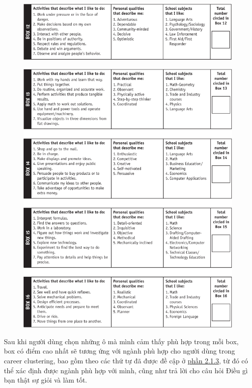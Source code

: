 \begin{figure}[H]
    \centering
    \includegraphics[width=0.9\linewidth]{images/chap3/CC4.png}
\end{figure}

\begin{figure}[H]
    \centering
    \includegraphics[width=0.9\linewidth]{images/chap3/CC5.png}
\end{figure}

Sau khi người dùng chọn những ô mà mình cảm thấy phù hợp trong mỗi box, box có điểm cao nhất sẽ tương ứng với ngành phù hợp cho người dùng trong career clustering, bao gồm theo các thứ tự đã được đề cập ở \hyperref[2.1.3]{phần 2.1.3}, từ đó có thể xác định được ngành phù hợp với mình, cũng như trả lời cho câu hỏi Điều gì bạn thật sự giỏi và làm tốt.